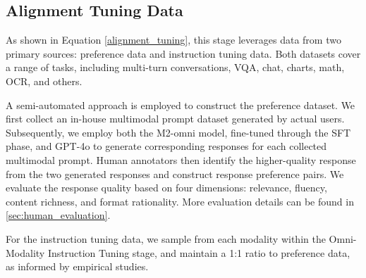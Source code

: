
\subsection{Alignment Tuning Data} \label{subsubsec:app_post_training_data}
As shown in Equation \eqref{alignment_tuning}, this stage leverages data from two primary sources: preference data and instruction tuning data. Both datasets cover a range of tasks, including multi-turn conversations, VQA, chat, charts, math, OCR, and others.

A semi-automated approach is employed to construct the preference dataset.  We first collect an in-house multimodal prompt dataset generated by actual users. Subsequently, we employ both the M2-omni model, fine-tuned through the SFT phase,  and GPT-4o to generate corresponding responses for each collected multimodal prompt. Human annotators then identify the higher-quality response from the two generated responses and construct response preference pairs. We evaluate the response quality based on four dimensions: relevance, fluency, content richness, and format rationality. More evaluation details can be found in \ref{sec:human_evaluation}.

For the instruction tuning data, we sample from each modality within the Omni-Modality Instruction Tuning stage,  and maintain a 1:1 ratio to preference data, as informed by empirical studies.



